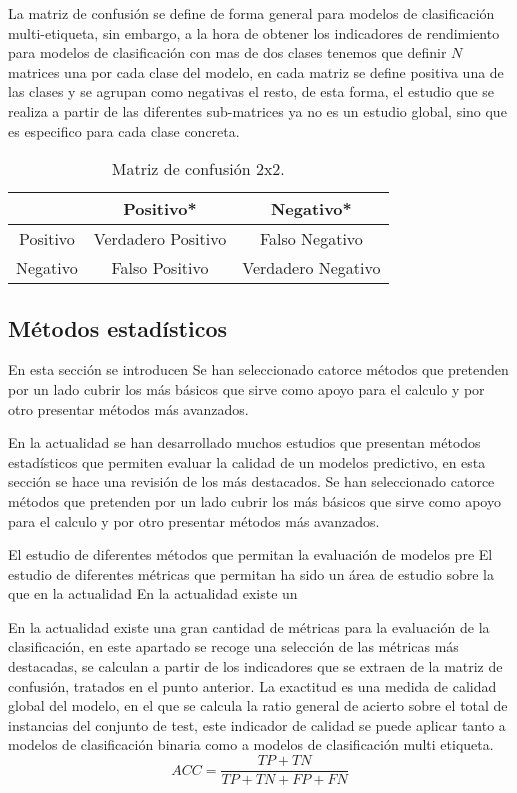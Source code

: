 \pagebreak

La matriz de confusión se define de forma general para modelos de clasificación multi-etiqueta, sin embargo, a la hora de obtener los indicadores de rendimiento para modelos de clasificación con mas de dos clases tenemos que definir $N$ matrices una por cada clase del modelo, en cada matriz se define positiva una de las clases y se agrupan como negativas el resto, de esta forma, el estudio que se realiza a partir de las diferentes sub-matrices ya no es un estudio global, sino que es especifico para cada clase concreta.

\begin{table}[ht]
    \centering
    \begin{tabular}[t]{ccc}
                 & Positivo*          & Negativo*          \\\hline
        Positivo & Verdadero Positivo & Falso Negativo     \\\hline
        Negativo & Falso Positivo     & Verdadero Negativo \\\hline
    \end{tabular}

    \caption{Matriz de confusión 2x2.}
    \label{tab:1}
\end{table}


\subsection{Métodos estadísticos}

En esta sección se introducen Se han seleccionado catorce métodos que pretenden por un lado cubrir los más básicos que sirve como apoyo para el calculo y por otro presentar métodos más avanzados.

En la actualidad se han desarrollado muchos estudios que presentan métodos estadísticos que permiten evaluar la calidad de un modelos predictivo, en esta sección se hace una revisión de los más destacados. Se han seleccionado catorce métodos que pretenden por un lado cubrir los más básicos que sirve como apoyo para el calculo y por otro presentar métodos más avanzados.

El estudio de diferentes métodos que permitan la evaluación de modelos pre
El estudio de diferentes métricas que permitan  ha sido un área de estudio sobre la que en la actualidad En la actualidad existe un

En la actualidad existe una gran cantidad de métricas para la evaluación de la clasificación, en este apartado se recoge una selección de las métricas más destacadas, se calculan a partir de los indicadores que se extraen de la matriz de confusión, tratados en el punto anterior.
\medbreak
La exactitud es una medida de calidad global del modelo, en el que se calcula la ratio general de acierto sobre el total de instancias del conjunto de test, este indicador de calidad se puede aplicar tanto a modelos de clasificación binaria como a modelos de clasificación multi etiqueta.
\medbreak
\begin{equation}\tag*{}
    ACC = \frac{TP+TN}{TP+TN+FP+FN}
\end{equation}

